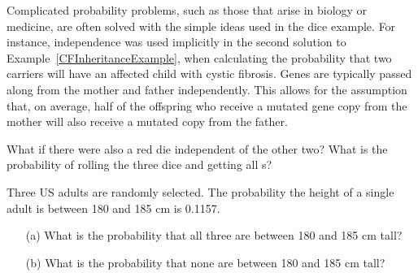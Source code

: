 Complicated probability problems, such as those that arise in biology or medicine, are often solved with the simple ideas used in the dice example. For instance, independence was used implicitly in the second solution to Example~\ref{CFInheritanceExample}, when calculating the probability that two carriers will have an affected child with cystic fibrosis. Genes are typically passed along from the mother and father independently. This allows for the assumption that, on average, half of the offspring who receive a mutated gene copy from the mother will also receive a mutated copy from the father.


\begin{exercisewrap}
\begin{nexercise}\label{threeDice}%
What if there were also a red die independent of the other two? What is the probability of rolling the three dice and getting all s?\footnotemark{}
\end{nexercise}
\end{exercisewrap}

\begin{exercisewrap}
\begin{nexercise}
Three US adults are randomly selected. The probability the height of a single adult is between 180 and 185 cm is 0.1157.\footnotemark{}\vspace{-1.5mm}
	\begin{enumerate}
		\setlength{\itemsep}{0mm}
		\item[(a)] What is the probability that all three are between 180 and 185 cm tall?
		\item[(b)] What is the probability that none are between 180 and 185 cm tall?
	\end{enumerate}
\end{nexercise}
\end{exercisewrap}

